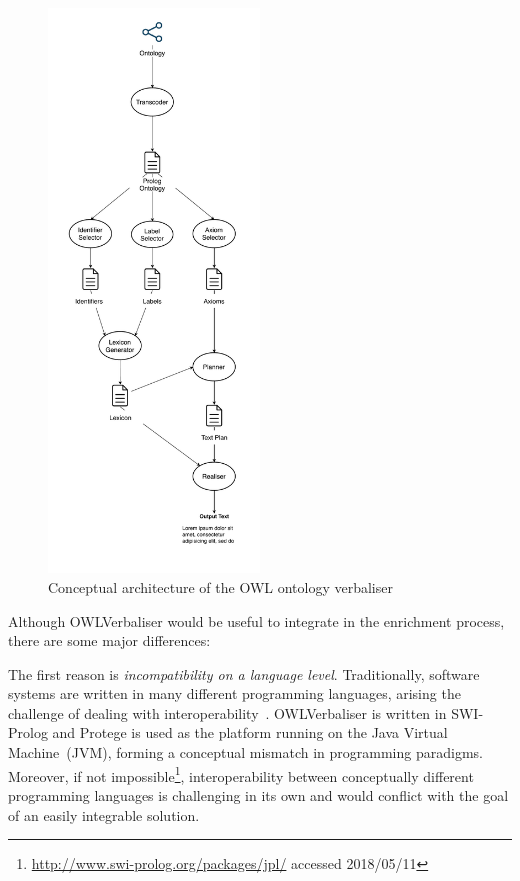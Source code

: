 \documentclass[draft,final]{vutinfth} %
\begin{document}
\begin{figure}
	 \centering
	 \includegraphics[width=0.5\textwidth]{drawio/Ontology_Verbaliser_Architecture}
	 \caption{Conceptual architecture of the OWL ontology verbaliser~\cite{stevens2011}}\label{fig:verbaliser_architecture}
\end{figure}

Although OWLVerbaliser would be useful to integrate in the enrichment process, there are some major differences:

The first reason is \emph{incompatibility on a language level}. Traditionally, software systems are written in many different programming languages, arising the challenge of dealing with interoperability~\cite{malone2014}. OWLVerbaliser is written in SWI-Prolog and Protege is used as the platform running on the Java Virtual Machine~(JVM), forming a conceptual mismatch in programming paradigms. Moreover, if not impossible\footnote{\url{http://www.swi-prolog.org/packages/jpl/} accessed 2018/05/11}, interoperability between conceptually different programming languages is challenging in its own and would conflict with the goal of an easily integrable solution.
\end{document}
